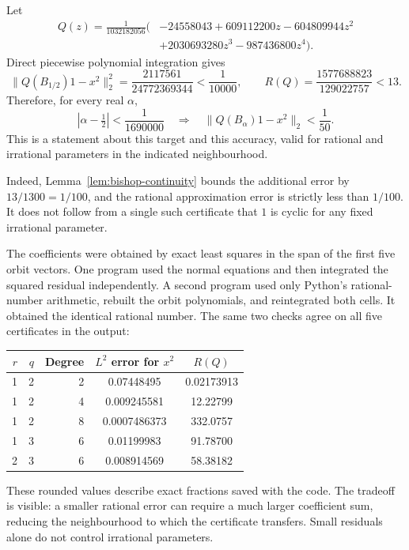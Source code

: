 \begin{example}\oursComputed{}
\label{ex:bishop-certificate}
Let
\[
\begin{split}
 Q(z)=\frac{1}{1032182056}\bigl(&-24558043+609112200z
       -604809944z^2\\
       &+2030693280z^3-987436800z^4\bigr).
\end{split}
\]
Direct piecewise polynomial integration gives
\[
 \|Q(B_{1/2})1-x^2\|_2^2
 =\frac{2117561}{24772369344}<\frac1{10000},
 \qquad R(Q)=\frac{1577688823}{129022757}<13.
\]
Therefore, for every real \(\alpha\),
\[
 |\alpha-\tfrac12|<\frac1{1690000}
 \quad\Longrightarrow\quad \|Q(B_\alpha)1-x^2\|_2<\frac1{50}.
\]
This is a statement about this target and this accuracy, valid for rational
and irrational parameters in the indicated neighbourhood.
\end{example}
Indeed, Lemma~\ref{lem:bishop-continuity} bounds the additional error by
\(13/1300=1/100\), and the rational approximation error is strictly less
than \(1/100\).  It does not follow from a single such certificate that
\(1\) is cyclic for any fixed irrational parameter.

The coefficients were obtained by exact least squares in the span of the
first five orbit vectors.  One program used the normal equations and then
integrated the squared residual independently.  A second program used only
Python's rational-number arithmetic, rebuilt the orbit polynomials, and
reintegrated both cells.  It obtained the identical rational number.
The same two checks agree on all five certificates in the output:
\begin{center}
\begin{tabular}{@{}rrrcc@{}}
\toprule
\(r\)&\(q\)&Degree&\(L^2\) error for \(x^2\)&\(R(Q)\)\\
\midrule
1&2&2&0.07448495&0.02173913\\
1&2&4&0.009245581&12.22799\\
1&2&8&0.0007486373&332.0757\\
1&3&6&0.01199983&91.78700\\
2&3&6&0.008914569&58.38182\\
\bottomrule
\end{tabular}
\end{center}
These rounded values describe exact fractions saved with the code.  The
tradeoff is visible: a smaller rational error can require a much larger
coefficient sum, reducing the neighbourhood to which the certificate
transfers.  Small residuals alone do not control irrational parameters.

